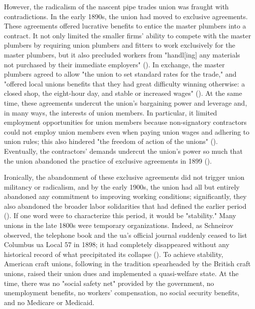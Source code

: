\documentclass[12pt]{article}
\begin{document}
However, the radicalism of the nascent pipe trades union was fraught with contradictions. In the early 1890s, the union had moved to exclusive agreements. These agreements offered lucrative benefits to entice the master plumbers into a contract. It not only limited the smaller firms’ ability to compete with the master plumbers by requiring union plumbers and fitters to work exclusively for the master plumbers, but it also precluded workers from "handl[ing] any materials not purchased by their immediate employers" (\cite[54]{schneirovPrideSolidarityHistory1993}). In exchange, the master plumbers agreed to allow "the union to set standard rates for the trade," and "offered local unions benefits that they had great difficulty winning otherwise: a closed shop, the eight-hour day, and stable or increased wages" (\citeyear[54]{schneirovPrideSolidarityHistory1993}). At the same time, these agreements undercut the union’s bargaining power and leverage and, in many ways, the interests of union members. In particular, it limited employment opportunities for union members because non-signatory contractors could not employ union members even when paying union wages and adhering to union rules; this also hindered "the freedom of action of the unions" (\citeyear[54]{schneirovPrideSolidarityHistory1993}). Eventually, the contractors’ demands undercut the union’s power so much that the union abandoned the practice of exclusive agreements in 1899 (\citeyear[54–55]{schneirovPrideSolidarityHistory1993}).

Ironically, the abandonment of these exclusive agreements did not trigger union militancy or radicalism, and by the early 1900s, the union had all but entirely abandoned any commitment to improving working conditions; significantly, they also abandoned the broader labor solidarities that had defined the earlier period (\cite[51–54]{schneirovPrideSolidarityHistory1993}). If one word were to characterize this period, it would be "stability." Many unions in the late 1800s were temporary organizations. Indeed, as Schneirov observed, the telephone book and the \acrshort{ua}’s official journal suddenly ceased to list Columbus \acrshort{ua} Local 57 in 1898; it had completely disappeared without any historical record of what precipitated its collapse  (\citeyear[51]{schneirovPrideSolidarityHistory1993}). To achieve stability, American craft unions, following in the tradition spearheaded by the British craft unions, raised their union dues and implemented a quasi-welfare state. At the time, there was no "social safety net" provided by the government, no unemployment benefits, no workers' compensation, no social security benefits, and no Medicare or Medicaid. 
\end{document}
